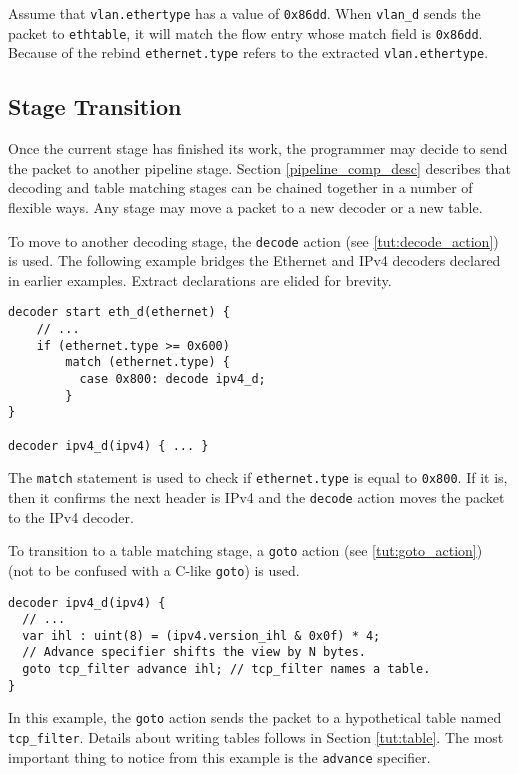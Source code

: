 Assume that \texttt{vlan.ethertype} has a value of \texttt{0x86dd}.
When \texttt{vlan\_d} sends the packet to \texttt{ethtable}, it will
match the flow entry whose match field is \texttt{0x86dd}. Because of
the rebind \texttt{ethernet.type} refers to the extracted \texttt{vlan.ethertype}.


\subsection{Stage Transition} \label{tut:decoder_next}

Once the current stage has finished its work, the programmer may decide
to send the packet to another pipeline stage.
Section \ref{pipeline_comp_desc} describes that decoding and
table matching stages can be chained together in a number of flexible ways.
Any stage may move a packet to a new decoder or a new table.

To move to another decoding stage, the \texttt{decode} action (see \ref{tut:decode_action})
is used. The following example bridges the Ethernet and IPv4 decoders
declared in earlier examples. Extract declarations are elided for
brevity.

\begin{lstlisting}
decoder start eth_d(ethernet) {
	// ...
	if (ethernet.type >= 0x600)
	    match (ethernet.type) {
	      case 0x800: decode ipv4_d;
	    }
}

decoder ipv4_d(ipv4) { ... }
\end{lstlisting}

The \texttt{match} statement is used to check if \texttt{ethernet.type} is equal to
\texttt{0x800}. If it is, then it confirms the next header is IPv4 and the \texttt{decode} action moves the packet to the IPv4 decoder.

To transition to a table matching stage, a \texttt{goto} action (see \ref{tut:goto_action}) (not
to be confused with a C-like \texttt{goto}) is used.

\begin{lstlisting}
decoder ipv4_d(ipv4) {
  // ...
  var ihl : uint(8) = (ipv4.version_ihl & 0x0f) * 4;
  // Advance specifier shifts the view by N bytes.
  goto tcp_filter advance ihl; // tcp_filter names a table.
}
\end{lstlisting}

In this example, the \texttt{goto} action sends the packet to a hypothetical table
named \texttt{tcp\_filter}. Details about writing tables follows in Section \ref{tut:table}. 
The most important thing to notice from this example is the
\texttt{advance} specifier.


